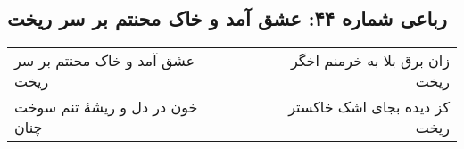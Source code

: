 \begin{center}
\section*{رباعی شماره ۴۴: عشق آمد و خاک محنتم بر سر ریخت}
\label{sec:sh044}
\begin{longtable}{l p{0.5cm} r}
عشق آمد و خاک محنتم بر سر ریخت
&&
زان برق بلا به خرمنم اخگر ریخت
\\
خون در دل و ریشهٔ تنم سوخت چنان
&&
کز دیده بجای اشک خاکستر ریخت
\\
\end{longtable}
\end{center}
